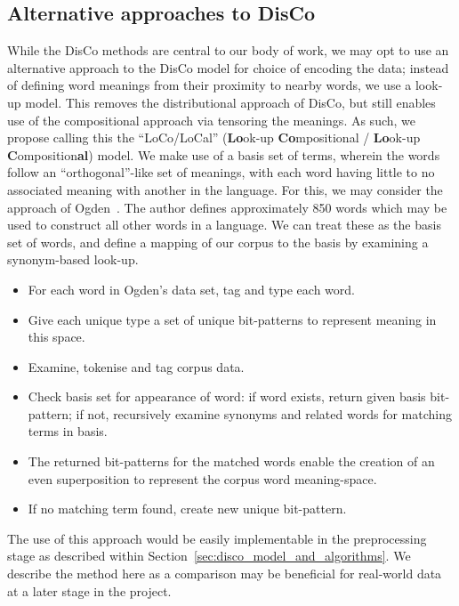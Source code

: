\begin{appendices}
\section{Alternative approaches to DisCo}

While the DisCo methods are central to our body of work, we may opt to use an alternative approach to the DisCo model for choice of encoding the data; instead of defining word meanings from their proximity to nearby words, we use a look-up model. This removes the distributional approach of DisCo, but still enables use of the compositional approach via tensoring the meanings. As such, we propose calling this the ``LoCo/LoCal'' (\textbf{Lo}ok-up \textbf{Co}mpositional / \textbf{Lo}ok-up \textbf{C}omposition\textbf{al}) model. We make use of a basis set of terms, wherein the words follow an ``orthogonal''-like set of meanings, with each word having little to no associated meaning with another in the language. For this, we may consider the approach of Ogden~\cite{OgdenC.K.CharlesKay1940BE:a}. The author defines approximately 850 words which may be used to construct all other words in a language. We can treat these as the basis set of words, and define a mapping of our corpus to the basis by examining a synonym-based look-up. 
\begin{itemize}
    \item For each word in Ogden's data set, tag and type each word.
    \item Give each unique type a set of unique bit-patterns to represent meaning in this space.
    \item Examine, tokenise and tag corpus data.
    \item Check basis set for appearance of word: if word exists, return given basis bit-pattern; if not, recursively examine synonyms and related words for matching terms in basis.
    \item The returned bit-patterns for the matched words enable the creation of an even superposition to represent the corpus word meaning-space.
    \item If no matching term found, create new unique bit-pattern.
\end{itemize}
The use of this approach would be easily implementable in the preprocessing stage as described within Section~\ref{sec:disco_model_and_algorithms}. We describe the method here as a comparison may be beneficial for real-world data at a later stage in the project.



\end{appendices}
